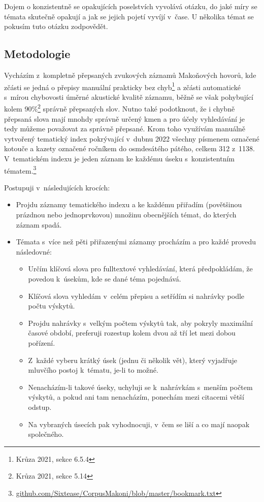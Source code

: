Dojem o konzistentně se opakujících poselstvích vyvolává otázku, do jaké míry se
témata skutečně opakují a jak se jejich pojetí vyvíjí v~čase. U několika témat
se pokusím tuto otázku zodpovědět.

\subsection{Metodologie}

Vycházím z~kompletně přepsaných zvukových záznamů Makoňových hovorů, kde zčásti
se jedná o přepisy manuální prakticky bez chyb\footnote{Krůza 2021, sekce 6.5.4} a zčásti automatické s~mírou
chybovosti úměrné akustické kvalitě záznamu, běžně se však pohybující kolem
90\%\footnote{Krůza 2021, sekce 5.14}
správně přepsaných slov. Nutno také podotknout, že i chybně přepsaná slova mají
mnohdy správně určený kmen a pro účely vyhledávání je tedy můžeme považovat za
správně přepsané. Krom toho využívám manuálně vytvořený tematický index
pokrývající v~dubnu 2022 všechny písmenem označené kotouče a kazety označené
ročníkem do osmdesátého pátého, celkem 312 z~1138. V~tematickém indexu je jeden
záznam ke každému úseku s~konzistentním tématem.\footnote{\href{https://github.com/Sixtease/CorpusMakoni/blob/master/bookmark.txt}{github.com/Sixtease/CorpusMakoni/blob/master/bookmark.txt}}

Postupuji v~následujících krocích:
\begin{itemize}
\item{
Projdu záznamy tematického indexu a ke každému přiřadím (povětšinou prázdnou nebo jednoprvkovou) množinu
obecnějších témat, do kterých záznam spadá.
}
\item{
Témata s~více než pěti přiřazenými záznamy procházím a pro každé provedu
následovné:
\begin{itemize}
\item{
Určím klíčová slova pro fulltextové vyhledávání, která předpokládám, že povedou
k~úsekům, kde se dané téma pojednává.
}
\item{
Klíčová slova vyhledám v~celém přepisu a setřídím si nahrávky podle počtu
výskytů.
}
\item{
Projdu nahrávky s~velkým počtem výskytů tak, aby pokryly maximální časové
období, preferuji rozestup kolem dvou až tří let mezi dobou pořízení.
}
\item{
Z~každé vyberu krátký úsek (jednu či několik vět), který vyjadřuje mluvčího
postoj k~tématu, je-li to možné.
}
\item{
Nenacházím-li takové úseky, uchyluji se k~nahrávkám s~menším počtem výskytů, a
pokud ani tam nenacházím, ponechám mezi citacemi větší odstup.
}
\item{
Na vybraných úsecích pak vyhodnocuji, v~čem se liší a co mají naopak
společného.
}
\end{itemize}
}
\end{itemize}

